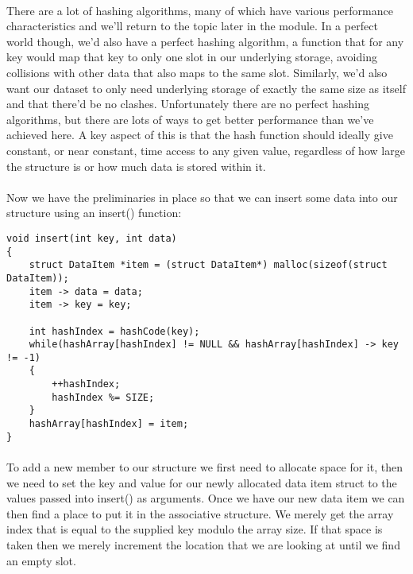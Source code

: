 \documentclass[10pt, a4paper, twosize]{article}
\begin{document}
\paragraph{} There are a lot of hashing algorithms, many of which have various performance characteristics and we'll return to the topic later in the module. In a perfect world though, we'd also have a perfect hashing algorithm, a function that for any key would map that key to only one slot in our underlying storage, avoiding collisions with other data that also maps to the same slot. Similarly, we'd also want our dataset to only need underlying storage of exactly the same size as itself and that there'd be no clashes. Unfortunately there are no perfect hashing algorithms, but there are lots of ways to get better performance than we've achieved here. A key aspect of this is that the hash function should ideally give constant, or near constant, time access to any given value, regardless of how large the structure is or how much data is stored within it.


\paragraph{} Now we have the preliminaries in place so that we can insert some data into our structure using an insert() function:
\begin{lstlisting}
void insert(int key, int data)
{
    struct DataItem *item = (struct DataItem*) malloc(sizeof(struct DataItem));
    item -> data = data;
    item -> key = key;

    int hashIndex = hashCode(key);
    while(hashArray[hashIndex] != NULL && hashArray[hashIndex] -> key != -1)
    {
        ++hashIndex;
        hashIndex %= SIZE;
    }
    hashArray[hashIndex] = item;
}
\end{lstlisting}
\paragraph{} To add a new member to our structure we first need to allocate space for it, then we need to set the key and value for our newly allocated data item struct to the values passed into insert() as arguments. Once we have our new data item we can then find a place to put it in the associative structure. We merely get the array index that is equal to the supplied key modulo the array size. If that space is taken then we merely increment the location that we are looking at until we find an empty slot.
\end{document}
